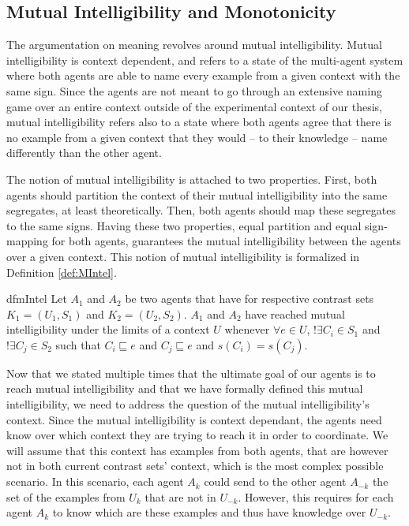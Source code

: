 \subsection{Mutual Intelligibility and Monotonicity}\label{sec:MutInt}

The argumentation on meaning revolves around mutual intelligibility. Mutual intelligibility is context dependent, and refers to a state of the multi-agent system where both agents are able to name every example from a given context with the same sign. Since the agents are not meant to go through an extensive naming game over an entire context outside of the experimental context of our thesis, mutual intelligibility refers also to a state where both agents agree that there is no example from a given context that they would -- to their knowledge -- name differently than the other agent.

The notion of mutual intelligibility is attached to two properties. First, both agents should partition the context of their mutual intelligibility into the same segregates, at least theoretically. Then, both agents should map these segregates to the same signs. Having these two properties, equal partition and equal sign-mapping for both agents, guarantees the mutual intelligibility between the agents over a given context. This notion of mutual intelligibility is formalized in Definition \ref{def:MIntel}.

\begin{restatable}{df}{mIntel}\label{def:MIntel}
Let $A_{1}$ and $A_{2}$ be two agents that have for respective contrast sets $K_{1} = (U_{1},S_{1})$ and $K_{2} = (U_{2},S_{2})$.  $A_{1}$ and $A_{2}$ have reached mutual intelligibility under the limits of a context $U$ whenever $\forall e \in U$, $!\exists C_{i} \in S_{1}$ and  $!\exists C_{j} \in S_{2}$ such that $C_{i} \sqsubseteq e$ and $C_{j} \sqsubseteq e$ and $s(C_{i}) = s(C_{j})$. 
\end{restatable}

Now that we stated multiple times that the ultimate goal of our agents is to reach mutual intelligibility and that we have formally defined this mutual intelligibility, we need to address the question of the mutual intelligibility's context. Since the mutual intelligibility is context dependant, the agents need know over which context they are trying to reach it in order to coordinate. We will assume that this context has examples from both agents, that are however not in both current contrast sets' context, which is the most complex possible scenario. In this scenario, each agent $A_{k}$ could send to the other agent $A_{-k}$ the set of the examples from $U_{k}$ that are not in $U_{-k}$. However, this requires for each agent $A_{k}$ to know which are these examples and thus have knowledge over $U_{-k}$.

